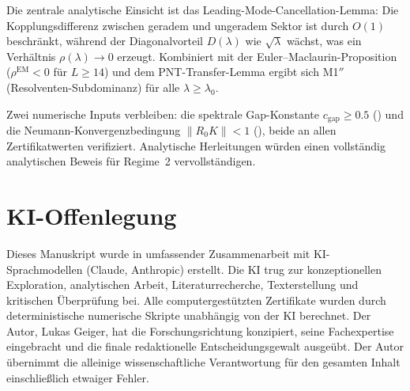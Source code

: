 \documentclass[12pt,a4paper]{article}
\theoremstyle{definition}
\theoremstyle{remark}
\begin{document}
Die zentrale analytische Einsicht ist das Leading-Mode-Cancellation-Lemma: Die Kopplungsdifferenz zwischen geradem und ungeradem Sektor ist durch $O(1)$ beschränkt, während der Diagonalvorteil $D(\lambda)$ wie $\sqrt{\lambda}$ wächst, was ein Verhältnis $\rho(\lambda) \to 0$ erzeugt. Kombiniert mit der Euler--Maclaurin-Proposition ($\rho^{\mathrm{EM}} < 0$ für $L \geq 14$) und dem PNT-Transfer-Lemma ergibt sich M1$''$ (Resolventen-Subdominanz) für alle $\lambda \geq \lambda_0$.

Zwei numerische Inputs verbleiben: die spektrale Gap-Konstante $c_{\mathrm{gap}} \geq 0.5$ () und die Neumann-Konvergenzbedingung $\|R_0 K\| < 1$ (), beide an allen Zertifikatwerten verifiziert. Analytische Herleitungen würden einen vollständig analytischen Beweis für Regime~2 vervollständigen.


\section*{KI-Offenlegung}

Dieses Manuskript wurde in umfassender Zusammenarbeit mit KI-Sprachmodellen (Claude, Anthropic) erstellt. Die KI trug zur konzeptionellen Exploration, analytischen Arbeit, Literaturrecherche, Texterstellung und kritischen Überprüfung bei. Alle computergestützten Zertifikate wurden durch deterministische numerische Skripte unabhängig von der KI berechnet. Der Autor, Lukas Geiger, hat die Forschungsrichtung konzipiert, seine Fachexpertise eingebracht und die finale redaktionelle Entscheidungsgewalt ausgeübt. Der Autor übernimmt die alleinige wissenschaftliche Verantwortung für den gesamten Inhalt einschließlich etwaiger Fehler.
\end{document}
